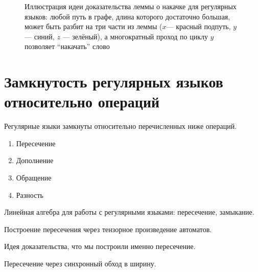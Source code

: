 \begin{figure}
    \begin{center}
    \end{center}
    \caption{Иллюстрация идеи доказательства леммы о накачке для регулярных языков: любой путь в графе, длина которого достаточно большая, может быть разбит на три части из леммы ($x$--- красный подпуть, $y$ --- синий, $z$ --- зелёный), а многократный проход по циклу $y$ позволяет ``накачать'' слово}
    \label{fig:reg_lang_pumping_lemma}
\end{figure}


\section{Замкнутость регулярных языков относительно операций}

\begin{theorem}
    Регулярные языки замкнуты относительно перечисленных ниже операций.
    \begin{enumerate}
        \item Пересечение
        \item Дополнение
        \item Обращение
        \item Разность
    \end{enumerate}
\end{theorem}

Линейная алгебра для работы с регулярными языками: пересечение, замыкание.

Построение пересечения через тензорное произведение автоматов.

Идея доказательства, что мы построили именно пересечение.

Пересечение через синхронный обход в ширину.

%
%
